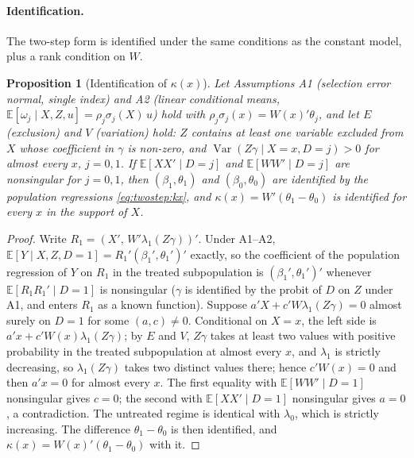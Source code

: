 \documentclass[11pt,a4paper]{article}
\theoremstyle{plain}
\newtheorem{proposition}{Proposition}
\theoremstyle{definition}
\theoremstyle{remark}
\newcommand{\E}{\mathbb{E}}
\newcommand{\Var}{\operatorname{Var}}
\newcommand{\1}{\mathbf{1}}
\newcommand{\kX}{\kappa(x)}
\begin{document}
\paragraph{Identification.}
The two-step form is identified under the same conditions as the constant
model, plus a rank condition on $W$.

\begin{proposition}[Identification of $\kX$]\label{prop:kx}
Let Assumptions A1 (selection error normal, single index) and A2 (linear
conditional means, $\E[\omega_j\mid X,Z,u]=\rho_j\sigma_j(X)\,u$) hold with
$\rho_j\sigma_j(x)=W(x)'\theta_j$, and let $E$ (exclusion) and $V$
(variation) hold: $Z$ contains at least one variable excluded from $X$
whose coefficient in $\gamma$ is non-zero, and $\Var(Z\gamma\mid X=x,D=j)>0$
for almost every $x$, $j=0,1$. If $\E[XX'\mid D=j]$ and $\E[WW'\mid D=j]$ are
nonsingular for $j=0,1$, then $(\beta_1,\theta_1)$ and $(\beta_0,\theta_0)$
are identified by the population regressions \eqref{eq:twostep:kx}, and
$\kX=W'(\theta_1-\theta_0)$ is identified for every $x$ in the support of
$X$.
\end{proposition}

\begin{proof}
Write $R_1=(X',\,W'\lambda_1(Z\gamma))'$. Under A1--A2,
$\E[Y\mid X,Z,D=1]=R_1'(\beta_1',\theta_1')'$ exactly, so the coefficient of
the population regression of $Y$ on $R_1$ in the treated subpopulation is
$(\beta_1',\theta_1')'$ whenever $\E[R_1R_1'\mid D=1]$ is nonsingular
($\gamma$ is identified by the probit of $D$ on $Z$ under A1, and enters
$R_1$ as a known function). Suppose $a'X+c'W\lambda_1(Z\gamma)=0$ almost
surely on $D=1$ for some $(a,c)\neq0$. Conditional on $X=x$, the left side
is $a'x+c'W(x)\lambda_1(Z\gamma)$; by $E$ and $V$, $Z\gamma$ takes at least
two values with positive probability in the treated subpopulation at almost
every $x$, and $\lambda_1$ is strictly decreasing, so $\lambda_1(Z\gamma)$
takes two distinct values there; hence $c'W(x)=0$ and then $a'x=0$ for
almost every $x$. The first equality with $\E[WW'\mid D=1]$ nonsingular
gives $c=0$; the second with $\E[XX'\mid D=1]$ nonsingular gives $a=0$, a
contradiction.
The untreated regime is identical with $\lambda_0$, which is strictly
increasing. The difference $\theta_1-\theta_0$ is then identified, and
$\kX=W(x)'(\theta_1-\theta_0)$ with it.
\end{proof}
\end{document}

